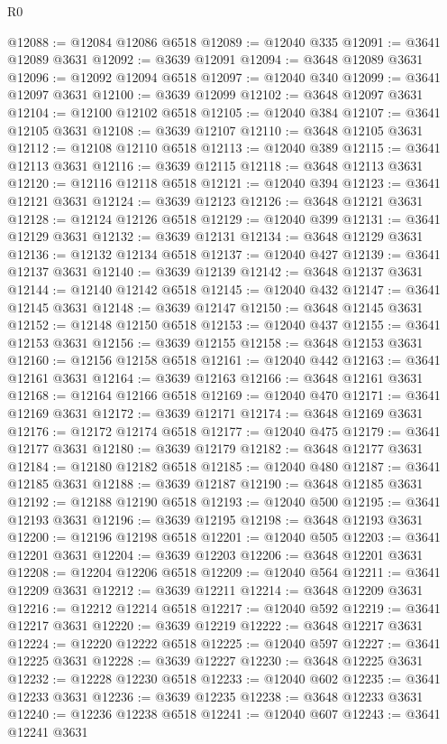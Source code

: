 \begin{lexlean}{R0}
\begin{coremodule}
@12088 := @12084 @12086 @6518
@12089 := @12040 @335
@12091 := @3641 @12089 @3631
@12092 := @3639 @12091
@12094 := @3648 @12089 @3631
@12096 := @12092 @12094 @6518
@12097 := @12040 @340
@12099 := @3641 @12097 @3631
@12100 := @3639 @12099
@12102 := @3648 @12097 @3631
@12104 := @12100 @12102 @6518
@12105 := @12040 @384
@12107 := @3641 @12105 @3631
@12108 := @3639 @12107
@12110 := @3648 @12105 @3631
@12112 := @12108 @12110 @6518
@12113 := @12040 @389
@12115 := @3641 @12113 @3631
@12116 := @3639 @12115
@12118 := @3648 @12113 @3631
@12120 := @12116 @12118 @6518
@12121 := @12040 @394
@12123 := @3641 @12121 @3631
@12124 := @3639 @12123
@12126 := @3648 @12121 @3631
@12128 := @12124 @12126 @6518
@12129 := @12040 @399
@12131 := @3641 @12129 @3631
@12132 := @3639 @12131
@12134 := @3648 @12129 @3631
@12136 := @12132 @12134 @6518
@12137 := @12040 @427
@12139 := @3641 @12137 @3631
@12140 := @3639 @12139
@12142 := @3648 @12137 @3631
@12144 := @12140 @12142 @6518
@12145 := @12040 @432
@12147 := @3641 @12145 @3631
@12148 := @3639 @12147
@12150 := @3648 @12145 @3631
@12152 := @12148 @12150 @6518
@12153 := @12040 @437
@12155 := @3641 @12153 @3631
@12156 := @3639 @12155
@12158 := @3648 @12153 @3631
@12160 := @12156 @12158 @6518
@12161 := @12040 @442
@12163 := @3641 @12161 @3631
@12164 := @3639 @12163
@12166 := @3648 @12161 @3631
@12168 := @12164 @12166 @6518
@12169 := @12040 @470
@12171 := @3641 @12169 @3631
@12172 := @3639 @12171
@12174 := @3648 @12169 @3631
@12176 := @12172 @12174 @6518
@12177 := @12040 @475
@12179 := @3641 @12177 @3631
@12180 := @3639 @12179
@12182 := @3648 @12177 @3631
@12184 := @12180 @12182 @6518
@12185 := @12040 @480
@12187 := @3641 @12185 @3631
@12188 := @3639 @12187
@12190 := @3648 @12185 @3631
@12192 := @12188 @12190 @6518
@12193 := @12040 @500
@12195 := @3641 @12193 @3631
@12196 := @3639 @12195
@12198 := @3648 @12193 @3631
@12200 := @12196 @12198 @6518
@12201 := @12040 @505
@12203 := @3641 @12201 @3631
@12204 := @3639 @12203
@12206 := @3648 @12201 @3631
@12208 := @12204 @12206 @6518
@12209 := @12040 @564
@12211 := @3641 @12209 @3631
@12212 := @3639 @12211
@12214 := @3648 @12209 @3631
@12216 := @12212 @12214 @6518
@12217 := @12040 @592
@12219 := @3641 @12217 @3631
@12220 := @3639 @12219
@12222 := @3648 @12217 @3631
@12224 := @12220 @12222 @6518
@12225 := @12040 @597
@12227 := @3641 @12225 @3631
@12228 := @3639 @12227
@12230 := @3648 @12225 @3631
@12232 := @12228 @12230 @6518
@12233 := @12040 @602
@12235 := @3641 @12233 @3631
@12236 := @3639 @12235
@12238 := @3648 @12233 @3631
@12240 := @12236 @12238 @6518
@12241 := @12040 @607
@12243 := @3641 @12241 @3631

\end{coremodule}
\end{lexlean}
